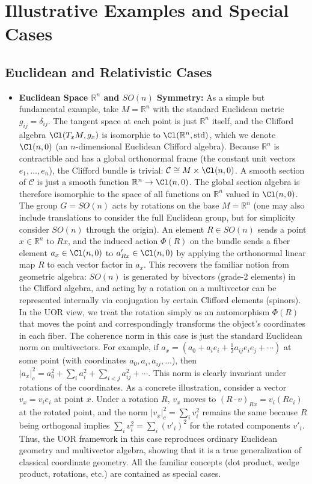 \documentclass[12pt]{article}
\begin{document}
\section{Illustrative Examples and Special Cases}

\subsection{Euclidean and Relativistic Cases}
\begin{itemize}
    \item \textbf{Euclidean Space $\mathbb{R}^n$ and $SO(n)$ Symmetry:} As a simple but fundamental example, take $M = \mathbb{R}^n$ with the standard Euclidean metric $g_{ij} = \delta_{ij}$. The tangent space at each point is just $\mathbb{R}^n$ itself, and the Clifford algebra $\Cl(T_x M, g_x)$ is isomorphic to $\Cl(\mathbb{R}^n,\text{std})$, which we denote $\Cl(n,0)$ (an $n$-dimensional Euclidean Clifford algebra). Because $\mathbb{R}^n$ is contractible and has a global orthonormal frame (the constant unit vectors $e_1,\dots,e_n$), the Clifford bundle is trivial: $\mathcal{C} \cong M \times \Cl(n,0)$. A smooth section of $\mathcal{C}$ is just a smooth function $\mathbb{R}^n \to \Cl(n,0)$. The global section algebra is therefore isomorphic to the space of all functions on $\mathbb{R}^n$ valued in $\Cl(n,0)$. The group $G = SO(n)$ acts by rotations on the base $M = \mathbb{R}^n$ (one may also include translations to consider the full Euclidean group, but for simplicity consider $SO(n)$ through the origin). An element $R \in SO(n)$ sends a point $x \in \mathbb{R}^n$ to $R x$, and the induced action $\Phi(R)$ on the bundle sends a fiber element $a_x \in \Cl(n,0)$ to $a_{R x}' \in \Cl(n,0)$ by applying the orthonormal linear map $R$ to each vector factor in $a_x$. This recovers the familiar notion from geometric algebra: $SO(n)$ is generated by bivectors (grade-2 elements) in the Clifford algebra, and acting by a rotation on a multivector can be represented internally via conjugation by certain Clifford elements (spinors). In the UOR view, we treat the rotation simply as an automorphism $\Phi(R)$ that moves the point and correspondingly transforms the object’s coordinates in each fiber. The coherence norm in this case is just the standard Euclidean norm on multivectors. For example, if $a_x = (a_0 + a_i e_i + \frac{1}{2}a_{ij} e_i e_j + \cdots)$ at some point (with coordinates $a_0, a_i, a_{ij}, \dots$), then $|a_x|_c^2 = a_0^2 + \sum_i a_i^2 + \sum_{i<j} a_{ij}^2 + \cdots$. This norm is clearly invariant under rotations of the coordinates. As a concrete illustration, consider a vector $v_x = v_i e_i$ at point $x$. Under a rotation $R$, $v_x$ moves to $(R\cdot v)_{R x} = v_i (R e_i)$ at the rotated point, and the norm $|v_x|_c^2 = \sum_i v_i^2$ remains the same because $R$ being orthogonal implies $\sum_i v_i^2 = \sum_i (v'_i)^2$ for the rotated components $v'_i$. Thus, the UOR framework in this case reproduces ordinary Euclidean geometry and multivector algebra, showing that it is a true generalization of classical coordinate geometry. All the familiar concepts (dot product, wedge product, rotations, etc.) are contained as special cases.


\end{itemize}
\end{document}
